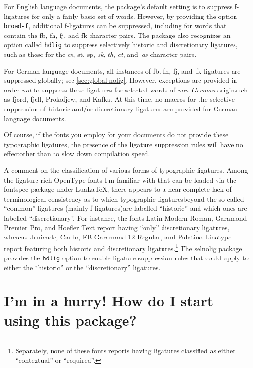 \documentclass[12pt]{article}
\newcommand{\pkg}[1]{\textsf{#1}}
\newcommand{\opt}[1]{\texttt{#1}}
\begin{document}
For English language documents, the package's default setting is to suppress f-ligatures for only a fairly basic set of words. However, by providing the option \opt{broad-f}, additional f-ligatures can be suppressed, including for words that contain the {\ebg \mbox{fb}, \mbox{fh}, \mbox{fj}, and \mbox{fk}} character pairs. The package also recognizes an option called \opt{hdlig} to suppress selectively historic and discretionary ligatures, such as those for the ct, st, sp, {\ebg\emph{sk}}, \emph{th}, \emph{et}, and~\emph{as} character pairs. 


For German language documents, all instances of {\ebg \mbox{fb}, \mbox{fh}, \mbox{fj}, and~\mbox{fk}} ligatures are suppressed globally; see \cref{sec:global-nolig}. However, exceptions are provided in order \emph{not} to suppress these ligatures for selected words of \emph{non-German} origin\textemdash such as fjord, fjell, Prokofjew, and {\ebg Kafka}. At this time, no macros for the selective suppression of historic and/or discretionary ligatures are provided for German language documents.

Of course, if the fonts you employ for your documents do not provide these typographic ligatures, the presence of the ligature suppression rules will have no effect\textemdash other than to slow down compilation speed.

 

A comment on the classification of various forms of typographic ligatures. Among the ligature-rich OpenType fonts I'm familiar with that can be loaded via the \pkg{fontspec} package under Lua\LaTeX, there appears to a near-complete lack of terminological consistency as to which typographic ligatures\textemdash beyond the so-called \enquote{common} ligatures (mainly f-ligatures)\textemdash are labelled \enquote{historic} and which ones are labelled \enquote{discretionary}. For instance, the fonts Latin Modern Roman, Garamond Premier Pro, and Hoefler Text report having \enquote{only} discretionary ligatures, whereas Junicode, Cardo, EB Garamond 12 Regular, and Palatino Linotype report  featuring both historic and discretionary ligatures.\footnote{Separately, none of these fonts reports having ligatures classified as either \enquote{contextual} or \enquote{required}.} The \pkg{selnolig} package provides the \opt{hdlig} option to enable ligature suppression rules that could apply to either the \enquote{historic} or the \enquote{discretionary} ligatures.

\section{I'm in a hurry! How do I start using this package?}
\end{document}
